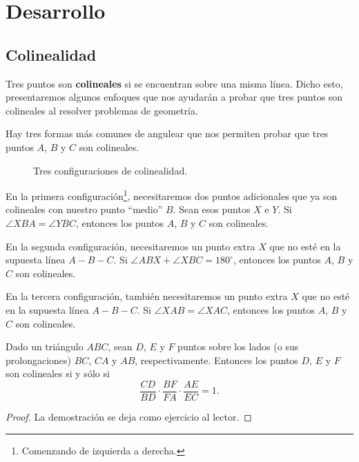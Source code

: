 \section{Desarrollo}



\subsection{Colinealidad}

\begin{figure}[H]
    \centering
    
\end{figure}

Tres puntos son \textbf{colineales} si se encuentran sobre una misma línea.
Dicho esto, presentaremos algunos enfoques que nos ayudarán a probar que tres puntos son colineales al resolver problemas de geometría.

Hay tres formas más comunes de angulear que nos permiten probar que tres puntos $A$, $B$ y $C$ son colineales.

\begin{figure}[H]
    \centering
    
    \caption{Tres configuraciones de colinealidad.}
\end{figure}

En la primera configuración\footnote{Comenzando de izquierda a derecha.}, necesitaremos dos puntos adicionales que ya son colineales con nuestro punto ``medio'' $B$.
Sean esos puntos $X$ e $Y$.
Si $\angle XBA = \angle YBC$, entonces los puntos $A$, $B$ y $C$ son colineales.

En la segunda configuración, necesitaremos un punto extra $X$ que no esté en la supuesta línea $A - B - C$.
Si $\angle ABX + \angle XBC = 180^\circ$, entonces los puntos $A$, $B$ y $C$ son colineales.

En la tercera configuración, también necesitaremos un punto extra $X$ que no esté en la supuesta línea $A - B - C$.
Si $\angle XAB = \angle XAC$, entonces los puntos $A$, $B$ y $C$ son colineales.


\begin{section-theorem.tcb}
    Dado un triángulo $ABC$, sean $D$, $E$ y $F$ puntos sobre los lados (o sus prolongaciones) $BC$, $CA$ y $AB$, respectivamente.
    Entonces los puntos $D$, $E$ y $F$ son colineales si y sólo si
    \[
        \frac{CD}{BD} \cdot \frac{BF}{FA} \cdot \frac{AE}{EC} = 1.
    \]
\end{section-theorem.tcb}
\begin{proof}
    La demostración se deja como ejercicio al lector.
\end{proof}

